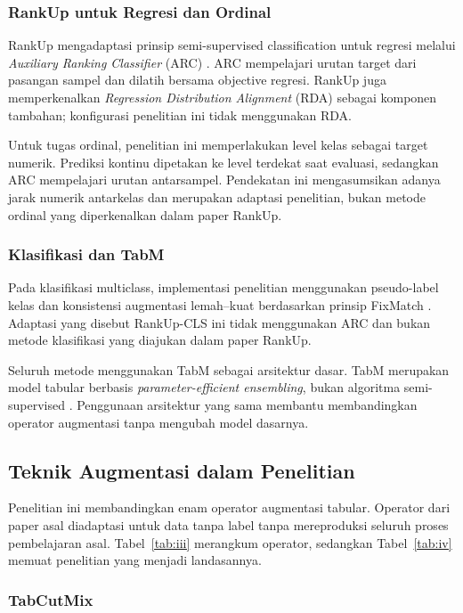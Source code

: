 \subsubsection{RankUp untuk Regresi dan Ordinal}

RankUp mengadaptasi prinsip semi-supervised classification untuk regresi melalui \textit{Auxiliary Ranking Classifier} (ARC) \cite{ref10}. ARC mempelajari urutan target dari pasangan sampel dan dilatih bersama objective regresi. RankUp juga memperkenalkan \textit{Regression Distribution Alignment} (RDA) sebagai komponen tambahan; konfigurasi penelitian ini tidak menggunakan RDA.

Untuk tugas ordinal, penelitian ini memperlakukan level kelas sebagai target numerik. Prediksi kontinu dipetakan ke level terdekat saat evaluasi, sedangkan ARC mempelajari urutan antarsampel. Pendekatan ini mengasumsikan adanya jarak numerik antarkelas dan merupakan adaptasi penelitian, bukan metode ordinal yang diperkenalkan dalam paper RankUp.

\subsubsection{Klasifikasi dan TabM}

Pada klasifikasi multiclass, implementasi penelitian menggunakan pseudo-label kelas dan konsistensi augmentasi lemah--kuat berdasarkan prinsip FixMatch \cite{ref9}. Adaptasi yang disebut RankUp-CLS ini tidak menggunakan ARC dan bukan metode klasifikasi yang diajukan dalam paper RankUp.

Seluruh metode menggunakan TabM sebagai arsitektur dasar. TabM merupakan model tabular berbasis \textit{parameter-efficient ensembling}, bukan algoritma semi-supervised \cite{ref11}. Penggunaan arsitektur yang sama membantu membandingkan operator augmentasi tanpa mengubah model dasarnya.

\subsection{Teknik Augmentasi dalam Penelitian}

Penelitian ini membandingkan enam operator augmentasi tabular. Operator dari paper asal diadaptasi untuk data tanpa label tanpa mereproduksi seluruh proses pembelajaran asal. Tabel~\ref{tab:iii} merangkum operator, sedangkan Tabel~\ref{tab:iv} memuat penelitian yang menjadi landasannya.

\subsubsection{TabCutMix}


